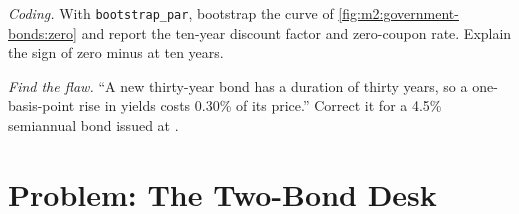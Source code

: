 \begin{exercise}[$\star\star\star$]\label{exo:m2:government-bonds:7}
\emph{Coding.} With \texttt{bootstrap\_par}, bootstrap the  curve of
\cref{fig:m2:government-bonds:zero} and report the ten-year discount factor and
zero-coupon rate. Explain the sign of zero minus  at ten years.
\end{exercise}

\begin{exercise}[$\star\star\star$]\label{exo:m2:government-bonds:8}
\emph{Find the flaw.} ``A new thirty-year bond has a duration of thirty
years, so a one-basis-point rise in yields costs 0.30\% of its price.''
Correct it for a 4.5\% semiannual bond issued at .
\end{exercise}

\section{Problem: The Two-Bond Desk}

